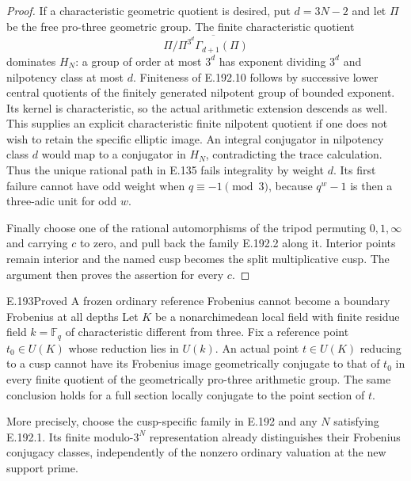 \begin{proof}
If a characteristic geometric quotient is desired, put \(d=3N-2\)
and let \(\Pi\) be the free pro-three geometric group.  The finite
characteristic quotient
\[
     \Pi\big/\overline{\Pi^{3^d}\Gamma_{d+1}(\Pi)}
\tag{E.192.10}
\]
dominates \(H_N\): a group of order at most \(3^d\) has exponent
dividing \(3^d\) and nilpotency class at most \(d\).  Finiteness of
E.192.10 follows by successive lower central quotients of the
finitely generated nilpotent group of bounded exponent.  Its kernel
is characteristic, so the actual arithmetic extension descends as
well.  This supplies an explicit characteristic finite nilpotent
quotient if one does not wish to retain the specific elliptic image.
An integral conjugator in nilpotency class \(d\) would map to a
conjugator in \(H_N\), contradicting the trace calculation.  Thus the
unique rational path in E.135 fails integrality by weight \(d\).
Its first failure cannot have odd weight when \(q\equiv-1\pmod3\),
because \(q^w-1\) is then a three-adic unit for odd \(w\).

Finally choose one of the rational automorphisms of the tripod
permuting \(0,1,\infty\) and carrying \(c\) to zero, and pull back
the family E.192.2 along it.  Interior points remain interior and
the named cusp becomes the split multiplicative cusp.  The argument
then proves the assertion for every \(c\).
\end{proof}

\begin{result}{E.193}{Proved}
{A frozen ordinary reference Frobenius cannot become a boundary Frobenius at all depths}
Let \(K\) be a nonarchimedean local field with finite residue field
\(k=\mathbb F_q\) of characteristic different from three.  Fix a
reference point \(t_0\in U(K)\) whose reduction lies in \(U(k)\).
An actual point \(t\in U(K)\) reducing to a cusp cannot have its
Frobenius image geometrically conjugate to that of \(t_0\) in every
finite quotient of the geometrically pro-three arithmetic group.
The same conclusion holds for a full section locally conjugate to
the point section of \(t\).

More precisely, choose the cusp-specific family in E.192 and any
\(N\) satisfying E.192.1.  Its finite modulo-\(3^N\) representation
already distinguishes their Frobenius conjugacy classes, independently
of the nonzero ordinary valuation at the new support prime.
\end{result}

